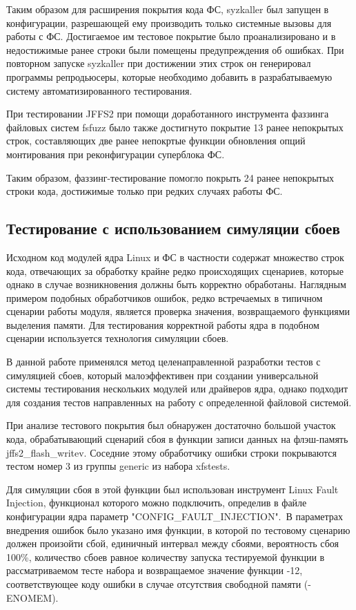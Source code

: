 Таким образом для расширения покрытия кода ФС, syzkaller был запущен в конфигурации, разрешающей ему производить только системные вызовы для работы с ФС. Достигаемое им тестовое покрытие было проанализировано и в недостижимые ранее строки были помещены предупреждения об ошибках. При повторном запуске syzkaller при достижении этих строк он генерировал программы репродьюсеры, которые необходимо добавить в разрабатываемую систему автоматизированного тестирования.

При тестировании JFFS2 при помощи доработанного инструмента фаззинга файловых систем fsfuzz было также достигнуто покрытие 13 ранее непокрытых строк, составляющих две ранее непокртые функции обновления опций монтирования при реконфигурации суперблока ФС.

Таким образом, фаззинг-тестирование помогло покрыть 24 ранее непокрытых строки кода, достижимые только при редких случаях работы ФС.

\subsection{Тестирование с использованием симуляции сбоев}

Исходном код модулей ядра Linux и ФС в частности содержат множество строк кода, отвечающих за обработку крайне редко происходящих сценариев, которые однако в случае возникновения должны быть корректно обработаны. Наглядным примером подобных обработчиков ошибок, редко встречаемых в типичном сценарии работы модуля, является проверка значения, возвращаемого функциями выделения памяти. Для тестирования корректной работы ядра в подобном сценарии используется технология симуляции сбоев.

В данной работе применялся метод целенаправленной разработки тестов с симуляцией сбоев, который малоэффективен при создании универсальной системы тестирования нескольких модулей или драйверов ядра, однако подходит для создания тестов направленных на работу с определенной файловой системой.

При анализе тестового покрытия был обнаружен достаточно большой участок кода, обрабатывающий сценарий сбоя в функции записи данных на флэш-память jffs2\_flash\_writev. Соседние этому обработчику ошибки строки покрываются тестом номер 3 из группы generic из набора xfstests. 

Для симуляции сбоя в этой функции был использован инструмент Linux Fault Injection, функционал которого можно подключить, определив в файле конфигурации ядра параметр "CONFIG\_FAULT\_INJECTION".\ В параметрах внедрения ошибок было указано имя функции, в которой по тестовому сценарию должен произойти сбой, единичный интервал между сбоями, вероятность сбоя 100\%, количество сбоев равное количеству запуска тестируемой функции в рассматриваемом тесте набора и возвращаемое значение функции -12, соответствующее коду ошибки в случае отсутствия свободной памяти (-ENOMEM).

